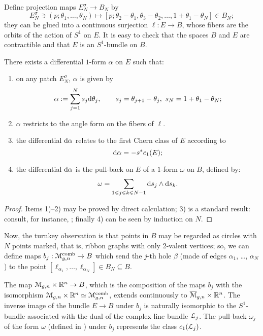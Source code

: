 Define projection maps $E^\sigma_N \to B_N$ by 
\begin{equation*}
  E_N^\sigma \ni (p; \theta_1, \ldots, \theta_N) \mapsto [p; \theta_2 - \theta_1, \theta_3 - \theta_2, \ldots, 1
  + \theta_1 - \theta_N] \in B_N;
\end{equation*}
they can be glued into a continuous surjection $\ell: E \to B$, whose
fibers are the orbits of the action of $S^1$ on $E$. It is easy to
check that the spaces $B$ and $E$ are contractible and that $E$ is an
$S^1$-bundle on $B$.
\begin{lemma}
  \label{thm:comb-bundle}
  There exists a differential $1$-form $\alpha$ on $E$ such that:
  \begin{enumerate}
  \item on any patch $E^\sigma_N$, $\alpha$ is given by
    \begin{equation*}
      \alpha := \sum_{j=1}^N s_j \mathrm{d}\theta_j, \qquad s_j= \theta_{j+1} - \theta_j, \ s_N = 1 +
      \theta_1 - \theta_N;
    \end{equation*}
  \item $\alpha$  restricts to the angle form on the fibers of $\ell$.
  \item   the differential $\mathrm{d}\alpha$ relates to the first Chern class of $E$
    according to
    \begin{equation*}
      \mathrm{d}\alpha = -s^*c_1(E);
    \end{equation*}
  \item the differential $\mathrm{d}\alpha$ is the pull-back on $E$ of a $1$-form $\omega$
    on $B$, defined by:
    \begin{equation*}
      \omega = \sum_{1\leqslant j\leqslant k\leqslant N-1} \mathrm{d} s_j \land \mathrm{d} s_k.
    \end{equation*}
  \end{enumerate}
\end{lemma}
\begin{proof}
  Items 1)--2) may be proved by direct calculation; 3) is a standard
  result: consult, for instance, \cite{bott-tu}; finally 4) can be
  seen by induction on $N$.
\end{proof}

Now, the turnkey observation is that points in $B$ may be regarded as
circles with $N$ points marked, that is, ribbon graphs with only
2-valent vertices; so, we can define maps $b_j: \mathcal{M}\sp{\text{comb}}_{g,n} \to B$ which
send the $j$-th hole $\beta$ (made of edges $\alpha_1$, \ldots, $\alpha_N$) to the
point $[\ell_{\alpha_1}, \ldots, \ell_{\alpha_N}] \in B_N \subseteq B$. 
\begin{theorem} The map $\mathcal{M}_{g,n} \times
  \mathbb{R}^n \to B$, which is the composition of the maps $b_j$ with the
  isomorphism $\mathcal{M}_{g,n} \times \mathbb{R}^n \simeq \mathcal{M}\sp{\text{comb}}_{g,n}$, extends continuously to
  $\overline{\mathcal{M}}_{g,n} \times \mathbb{R}^n$. The inverse image of the bundle $E \to B$ under
  $b_j$ is naturally isomorphic to the $S^1$-bundle associated with
  the dual of the complex line bundle ${\mathcal{L}}_j$. The pull-back $\omega_j$ of
  the form $\omega$ (defined in ) under $b_j$
  represents the class $c_1({\mathcal{L}}_j)$.
\end{theorem}



